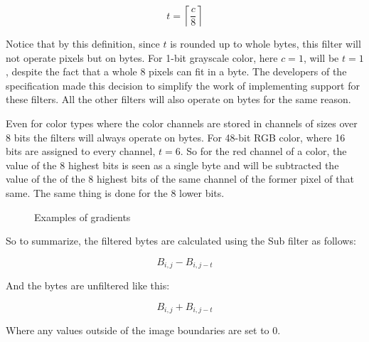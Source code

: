 \begin{equation*}
  t = \left\lceil \frac{c}{8} \right\rceil
\end{equation*}

Notice that by this definition, since $t$ is rounded up to whole
bytes, this filter will not operate pixels but on bytes. For 1-bit
grayscale color, here $c=1$, will be $t=1$, despite the fact that a
whole $8$ pixels can fit in a byte. The developers of the \png
specification made this decision to simplify the work of implementing
support for these filters. All the other filters will also operate on
bytes for the same reason.

Even for color types where the color channels are stored in channels
of sizes over $8$ bits the filters will always operate on bytes. For
48-bit RGB color, where 16 bits are assigned to every channel,
$t=6$. So for the red channel of a color, the value of the 8 highest
bits is seen as a single byte and will be subtracted the value of the
of the 8 highest bits of the same channel of the former pixel of that
same. The same thing is done for the 8 lower bits.

\begin{figure}[h!]
  \centering


  \caption{Examples of gradients}
\end{figure}

So to summarize, the filtered bytes are calculated using the Sub
filter as follows:

\begin{equation*}
  B_{i,j} - B_{i,j-t}
\end{equation*}

And the bytes are unfiltered like this:

\begin{equation*}
  B_{i,j} + B_{i,j-t}
\end{equation*}

Where any values outside of the image boundaries are set to $0$.

